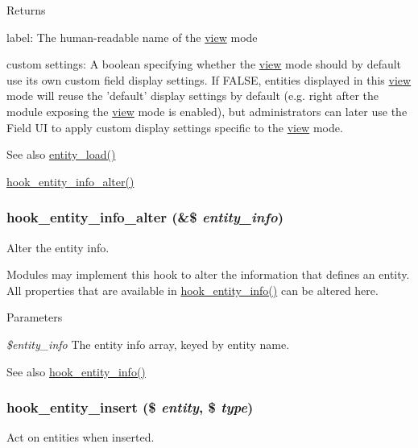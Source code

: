 \begin{DoxyReturn}{Returns}
\begin{DoxyItemize}
\begin{DoxyItemize}
\item label: The human-\/readable name of the \hyperlink{classview}{view} mode
\item custom settings: A boolean specifying whether the \hyperlink{classview}{view} mode should by default use its own custom field display settings. If FALSE, entities displayed in this \hyperlink{classview}{view} mode will reuse the 'default' display settings by default (e.g. right after the module exposing the \hyperlink{classview}{view} mode is enabled), but administrators can later use the Field UI to apply custom display settings specific to the \hyperlink{classview}{view} mode.
\end{DoxyItemize}
\end{DoxyItemize}
\end{DoxyReturn}
\begin{DoxySeeAlso}{See also}
\hyperlink{common_8inc_a78b89cf93f9710a68d02f86adccf1898}{entity\_\-load()} 

\hyperlink{group__hooks_ga0394a72e4872603e91ce22440195ab45}{hook\_\-entity\_\-info\_\-alter()} 
\end{DoxySeeAlso}
\hypertarget{group__hooks_ga0394a72e4872603e91ce22440195ab45}{
\subsubsection[{hook\_\-entity\_\-info\_\-alter}]{\setlength{\rightskip}{0pt plus 5cm}hook\_\-entity\_\-info\_\-alter (\&\$ {\em entity\_\-info})}}
\label{group__hooks_ga0394a72e4872603e91ce22440195ab45}
Alter the entity info.

Modules may implement this hook to alter the information that defines an entity. All properties that are available in \hyperlink{group__hooks_gaf02318e9d0e8cdbf6d187b271b9969a8}{hook\_\-entity\_\-info()} can be altered here.


\begin{DoxyParams}{Parameters}
\item[{\em \$entity\_\-info}]The entity info array, keyed by entity name.\end{DoxyParams}
\begin{DoxySeeAlso}{See also}
\hyperlink{group__hooks_gaf02318e9d0e8cdbf6d187b271b9969a8}{hook\_\-entity\_\-info()} 
\end{DoxySeeAlso}
\hypertarget{group__hooks_ga38882255a4252e0e87d77ecd9c75a0dd}{
\subsubsection[{hook\_\-entity\_\-insert}]{\setlength{\rightskip}{0pt plus 5cm}hook\_\-entity\_\-insert (\$ {\em entity}, \/  \$ {\em type})}}
\label{group__hooks_ga38882255a4252e0e87d77ecd9c75a0dd}
Act on entities when inserted.



